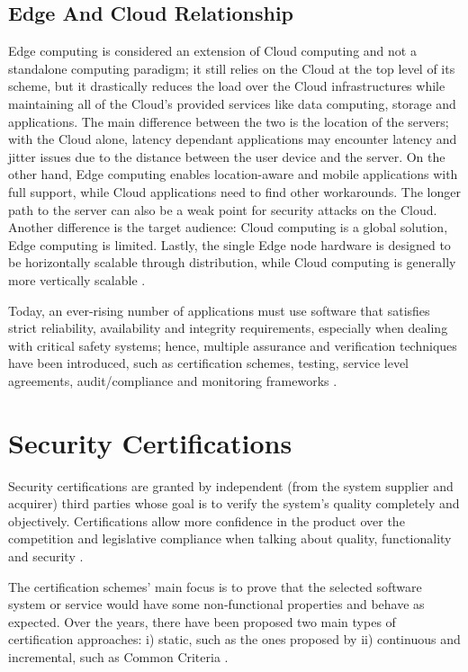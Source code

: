 \subsection{Edge And Cloud Relationship}
Edge computing is considered an extension of Cloud computing and not a standalone computing paradigm; it still relies on the Cloud at the top level of its scheme, but it drastically reduces the load over the Cloud infrastructures while maintaining all of the Cloud's provided services like data computing, storage and applications. The main difference between the two is the location of the servers; with the Cloud alone, latency dependant applications may encounter latency and jitter issues due to the distance between the user device and the server. On the other hand, Edge computing enables location-aware and mobile applications with full support, while Cloud applications need to find other workarounds. The longer path to the server can also be a weak point for security attacks on the Cloud. Another difference is the target audience: Cloud computing is a global solution, Edge computing is limited. Lastly, the single Edge node hardware is designed to be horizontally scalable through distribution, while Cloud computing is generally more vertically scalable \cite{khan2019edge}.


Today, an ever-rising number of applications must use software that satisfies strict reliability, availability and integrity requirements, especially when dealing with critical safety systems; hence, multiple assurance and verification techniques have been introduced, such as certification schemes, testing, service level agreements, audit/compliance and monitoring frameworks \cite{ardagna2015security}. 


\section{Security Certifications}
Security certifications are granted by independent (from the system supplier and acquirer) third parties whose goal is to verify the system's quality completely and objectively. Certifications allow more confidence in the product over the competition and legislative compliance when talking about quality, functionality and security \cite{heck2010software}.

The certification schemes' main focus is to prove that the selected software system or service would have some non-functional properties and behave as expected. 
Over the years, there have been proposed two main types of certification approaches: i) static, such as the ones proposed by \cite{anisetti2013test}\cite{CSATrustSTAR} ii) continuous and incremental, such as Common Criteria \cite{anisetti2017semi}\cite{infrastructure2002common}. 

